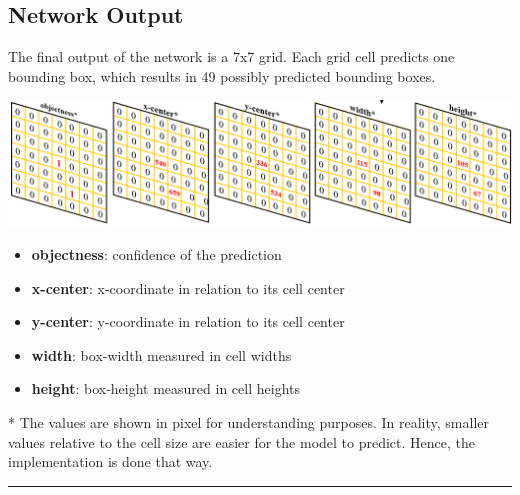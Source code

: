 \documentclass[landscape,a2,final,12pt]{issposter}
\begin{document}
\begin{samepage}
\begin{multicols}{3}
\section{Network Output}
    \begin{small}
        The final output of the network is a 7x7 grid. Each grid cell predicts one bounding box, which results in 49 possibly predicted bounding boxes.
    \end{small}
    \begin{center}
        \includegraphics[scale=0.55]{3_channels.png}
    \end{center}
    \begin{small}
        \begin{itemize}
            \item {\textbf{objectness}: confidence of the prediction}
            \item {\textbf{x-center}: x-coordinate in relation to its cell center}
            \item {\textbf{y-center}: y-coordinate in relation to its cell center}
            \item {\textbf{width}: box-width measured in cell widths}
            \item {\textbf{height}: box-height measured in cell heights}
        \end{itemize}
    \end{small}
    \begin{footnotesize}
        * The values are shown in pixel for understanding purposes. In reality, smaller values relative to the cell size are easier for the model to predict. Hence, the implementation is done that way.
    \end{footnotesize}
    
\end{multicols}


\rule{\textwidth}{8pt}

\begin{multicols}{3}

\end{multicols}
\end{samepage}
\end{document}
